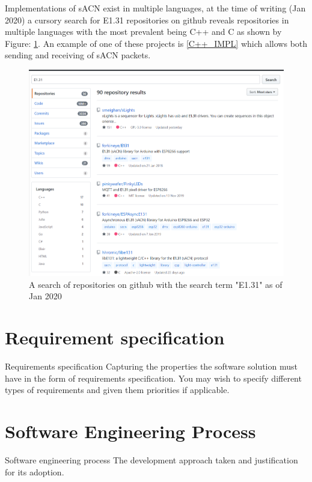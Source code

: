 \documentclass[11pt,a4paper,notitlepage]{report}
\begin{document}
	Implementations of sACN exist in multiple languages, at the time of writing (Jan 2020) a cursory search for E1.31 repositories on github reveals repositories in multiple languages with the most prevalent being C++ and C as shown by Figure: \ref{E131_REPO_SEARCH}. An example of one of these projects is \ref{C++_IMPL} which allows both sending and receiving of sACN packets.
	
	\begin{figure}
		\label{E131_REPO_SEARCH}
		\includegraphics[width=\textwidth]{E131-Repo-Search}
		\caption{A search of repositories on github with the search term "E1.31" as of Jan 2020}
	\end{figure}

	\section{Requirement specification}
	Requirements
	specification
	Capturing the properties the software solution must
	have in the form of requirements specification. You
	may wish to specify different types of requirements and
	given them priorities if applicable.
	
	\section{Software Engineering Process}
		Software
	engineering
	process
	The development approach taken and justification for
	its adoption.
\end{document}
